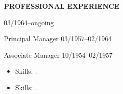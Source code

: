 %
%
%
%
%



\begin{center}
    \textbf{PROFESSIONAL EXPERIENCE}
\end{center}
\textbf{\expBCompany} \hfill \expBLocation

\textbf{\expBPosition} \hfill 03/1964--ongoing

Principal Manager \hfill 03/1957--02/1964

Associate Manager \hfill 10/1954--02/1957

\begin{itemize}[noitemsep, topsep=0pt, partopsep=0pt, parsep=0pt]
    \expBDetails
    \item Skills: \expBTechStack.
\end{itemize}

\vspace{\spaceSection}

\textbf{\expACompany} \hfill \expALocation

\expAPosition \hfill \expADate

\begin{itemize}[noitemsep, topsep=0pt, partopsep=0pt, parsep=0pt]
    \expADetails
    \item Skills: \expATechStack.
\end{itemize}
